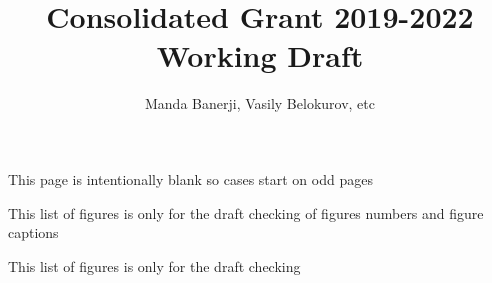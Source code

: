\documentclass[11pt,a4paper]{article}
\author{Manda Banerji, Vasily Belokurov, etc}
\title{Consolidated Grant 2019-2022 Working Draft}
\begin{document}

\ifcgdraft
    \layoutpagecheck
\fi



\newpage
\clearpage

\ifcgdebug








  
  \newpage

\fi


%
%
\newpage





\maketitle
\newpage
\centerline{This page is intentionally blank so cases start on odd pages}
\newpage

\setcounter{tocdepth}{1}
\tableofcontents
\newpage

\ifcgdraft
    This list of figures is only for the draft checking of figures numbers and figure captions
    
    \listoffigures
    \newpage
    
    This list of figures is only for the draft checking
    
\end{document}
